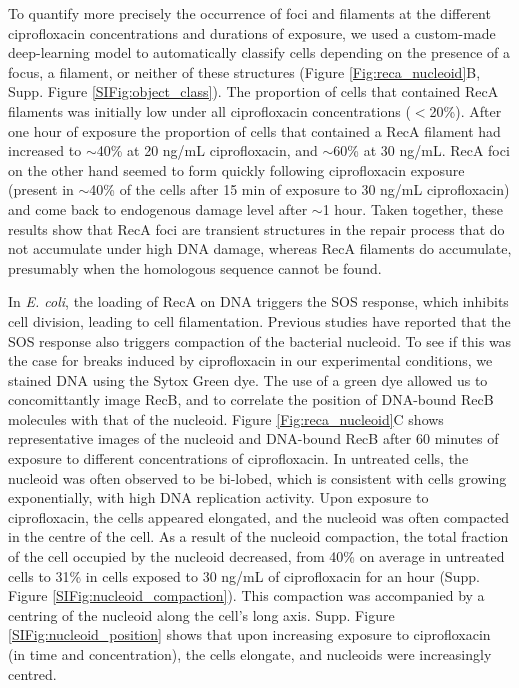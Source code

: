To quantify more precisely the occurrence of foci and filaments at the different ciprofloxacin concentrations and durations of exposure, we used a custom-made deep-learning model to automatically classify cells depending on the presence of a focus, a filament, or neither of these structures (Figure \ref{Fig:reca_nucleoid}B, Supp. Figure \ref{SIFig:object_class}). The proportion of cells that contained RecA filaments was initially low under all ciprofloxacin concentrations ($<$20\%). After one hour of exposure the proportion of cells that contained a RecA filament had increased to $\sim$40\% at 20 ng/mL ciprofloxacin, and $\sim$60\% at 30 ng/mL. RecA foci on the other hand seemed to form quickly following ciprofloxacin exposure (present in $\sim$40\% of the cells after 15 min of exposure to 30 ng/mL ciprofloxacin) and come back to endogenous damage level after $\sim$1 hour. Taken together, these results show that RecA foci are transient structures in the repair process that do not accumulate under high DNA damage, whereas RecA filaments do accumulate, presumably when the homologous sequence cannot be found.

In \emph{E. coli}, the loading of RecA on DNA triggers the SOS response, which inhibits cell division, leading to cell filamentation. Previous studies have reported that the SOS response also triggers compaction of the bacterial nucleoid.\cite{Odsbu2014} To see if this was the case for breaks induced by ciprofloxacin in our experimental conditions, we stained DNA using the Sytox Green dye. The use of a green dye allowed us to concomittantly image RecB, and to correlate the position of DNA-bound RecB molecules with that of the nucleoid. Figure \ref{Fig:reca_nucleoid}C shows representative images of the nucleoid and DNA-bound RecB after 60 minutes of exposure to different concentrations of ciprofloxacin. In untreated cells, the nucleoid was often observed to be bi-lobed, which is consistent with cells growing exponentially, with high DNA replication activity. Upon exposure to ciprofloxacin, the cells appeared elongated, and the nucleoid was often compacted in the centre of the cell. As a result of the nucleoid compaction, the total fraction of the cell occupied by the nucleoid decreased, from 40\% on average in untreated cells to 31\% in cells exposed to 30 ng/mL of ciprofloxacin for an hour (Supp. Figure \ref{SIFig:nucleoid_compaction}). This compaction was accompanied by a centring of the nucleoid along the cell's long axis. Supp. Figure \ref{SIFig:nucleoid_position} shows that upon increasing exposure to ciprofloxacin (in time and concentration), the cells elongate, and nucleoids were increasingly centred.

